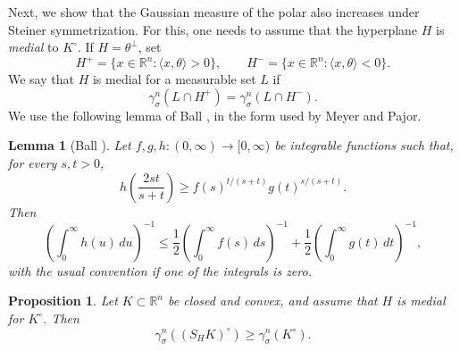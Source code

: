 \documentclass[12pt,oneside,reqno]{amsart}
\numberwithin{equation}{section}
\newtheorem{proposition}[theorem]{Proposition}
\newtheorem{lemma}[theorem]{Lemma}
\theoremstyle{remark}
\newcommand{\R}{\mathbb R}
\newcommand{\dd}{\,d}
\newcommand{\ip}[2]{\langle #1,#2\rangle}
\begin{document}
Next, we show that the Gaussian measure of the polar also increases under Steiner symmetrization. For this, one needs to assume that the hyperplane $H$ is \emph{medial} to $K^\circ$. If $H=\theta^\perp$, set
\[
        H^+=\{x\in\R^n:\ip{x}{\theta}>0\},\qquad
        H^-=\{x\in\R^n:\ip{x}{\theta}<0\}.
\]
We say that $H$ is medial for a measurable set $L$ if
\[
        \gamma_\sigma^n(L\cap H^+)=\gamma_\sigma^n(L\cap H^-).
\]
We use the following lemma of Ball \cite{Ball-thesis}, in the form used by Meyer and Pajor.
\begin{lemma}[Ball \cite{Ball-thesis}]\label{lem:Ball}
Let $f,g,h:(0,\infty)\to[0,\infty)$ be integrable functions such that, for every $s,t>0$,
\[
        h\left(\frac{2st}{s+t}\right)
        \ge f(s)^{t/(s+t)}g(t)^{s/(s+t)}.
\]
Then
\[
        \left(\int_0^\infty h(u)\dd u\right)^{-1}
        \le
        \frac12\left(\int_0^\infty f(s)\dd s\right)^{-1}
        +
        \frac12\left(\int_0^\infty g(t)\dd t\right)^{-1},
\]
with the usual convention if one of the integrals is zero.
\end{lemma}
\begin{proposition}\label{prop:dual-steiner}
Let $K\subset\R^n$ be closed and convex, and assume that $H$ is medial for $K^\circ$. Then
\[
        \gamma_\sigma^n((S_HK)^\circ)\ge \gamma_\sigma^n(K^\circ).
\]
\end{proposition}
\end{document}
